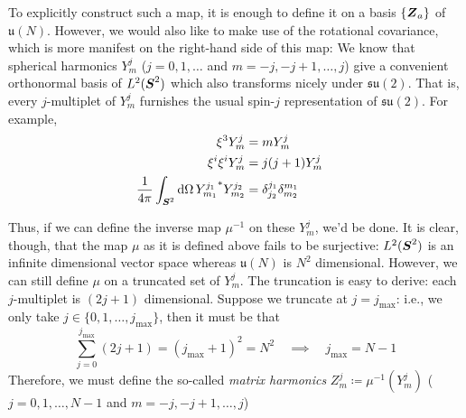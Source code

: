   To explicitly construct such a map, it is enough to define it on a basis $\{\boldsymbol{Z}_a\}$ of $\mathfrak{u}(N)$. However, we would also like to make use of the rotational covariance, which is more manifest on the right-hand side of this map: We know that spherical harmonics $Y^{j}_{m}$ ($j = 0, 1, \ldots$ and $m = -j, -j+1, \ldots, j$) give a convenient orthonormal basis of $L^2(\boldsymbol{S}^2)$ which also transforms nicely under $\mathfrak{su}(2)$. That is, every $j$-multiplet of $Y^{j}_{m}$ furnishes the usual spin-$j$ representation of $\mathfrak{su}(2)$. For example,
  \begin{align}
    \xi^{3}Y^{j}_{m} &= m Y^{j}_{m} \cr
    \xi^{i} \xi^{i} Y^{j}_{m} &= j(j+1) Y^{j}_{m} \cr
    \frac{1}{4\pi} \int_{\boldsymbol{S}^2} \text{d}\Omega \, {Y^{j_1}_{m_1}}^* {Y^{j_2}_{m_2}} &= \delta^{j_1}_{j_2} \delta^{m_1}_{m_2} 
  \end{align}

  Thus, if we can define the inverse map $\mu^{-1}$ on these $Y^{j}_{m}$, we'd be done. It is clear, though, that the map $\mu$ as it is defined above fails to be surjective: $L^2(\boldsymbol{S}^2)$ is an infinite dimensional vector space whereas $\mathfrak{u}(N)$ is $N^2$ dimensional. However, we can still define $\mu$ on a truncated set of $Y^{j}_{m}$. The truncation is easy to derive: each $j$-multiplet is $(2j+1)$ dimensional. Suppose we truncate at $j = j_{\text{max}}$: i.e., we only take $j \in \{0, 1, \ldots, j_{\text{max}}\}$, then it must be that
  \begin{equation}
    \sum_{j=0}^{j_{\text{max}}} (2j+1) = (j_{\text{max}}+1)^2 = N^2 \quad \implies \quad j_{\text{max}} = N-1
  \end{equation}
  Therefore, we must define the so-called \textit{matrix harmonics} $Z^{j}_{m} \coloneqq \mu^{-1}(Y^j_m)$ ($j = 0, 1, \ldots, N-1$ and $m = -j, -j+1, \ldots, j$)\\

